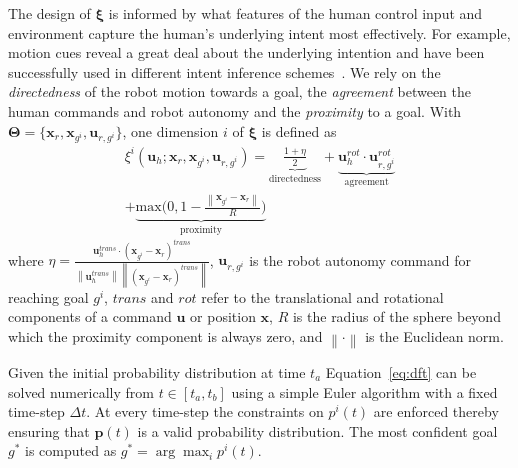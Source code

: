 \documentclass[natbib, twocolumn]{svjour3}          %
\newcommand{\argmax}{\arg\!\max}
\newcommand{\norm}[1]{\left\lVert#1\right\rVert}
\begin{document}
The design of $\boldsymbol{\xi}$ is informed by what features of the human control input and environment capture the human's underlying intent most effectively. For example, motion cues reveal a great deal about the underlying intention and have been successfully used in different intent inference schemes~\citep{barrett2005accurate}. We rely on the \textit{directedness} of the robot motion towards a goal, the \textit{agreement} between the human commands and robot autonomy and the \textit{proximity} to a goal. 
With $\boldsymbol{\Theta} = \{\boldsymbol{x}_r, \boldsymbol{x}_{g^i}, \boldsymbol{u}_{r, g^i}\}$, one dimension $i$ of $\boldsymbol{\xi}$ is defined as 
\begin{multline*}
\xi^i(\boldsymbol{u}_h;\boldsymbol{x}_r, \boldsymbol{x}_{g^i}, \boldsymbol{u}_{r, g^i}) = \underbrace{\frac{1 + \eta}{2}}_{\text{directedness}} + \underbrace{\boldsymbol{u}_{h}^{rot}\cdot\boldsymbol{u}_{r,g^i}^{rot}}_{\text{agreement}}
\\+ \underbrace{\text{max}\Big(0, 1-\frac{\norm{\boldsymbol{x}_{g^i} - \boldsymbol{x}_r}}{R}\Big)}_{\text{proximity}}
\end{multline*}
where  $\eta = \frac{\boldsymbol{u}_h^{trans}\cdot(\boldsymbol{x}_{g^i} - \boldsymbol{x}_r)^{trans}}{\norm{\boldsymbol{u}_h^{trans}}\norm{(\boldsymbol{x}_{g^i} - \boldsymbol{x}_r)^{trans}}}$, $\boldsymbol{u}_{r,g^i}$ is the robot autonomy command for reaching goal $g^i$, $trans$ and $rot$ refer to the translational and rotational components of a command $\boldsymbol{u}$ or position $\boldsymbol{x}$,  $R$ is the radius of the sphere beyond which the proximity component is always zero, and $\norm{\cdot}$ is the Euclidean norm. 

Given the initial probability distribution at time $t_a$ Equation~\ref{eq:dft} can be solved numerically from $t \in [t_a, t_b]$ using a simple Euler algorithm with a fixed time-step $\Delta t$. At every time-step the constraints on $p^i(t)$ are enforced thereby ensuring that $\boldsymbol{p}(t)$ is a valid probability distribution. 
The most confident goal $g^*$ is computed as $g^* = \argmax_i  p^i(t)$.
\end{document}
